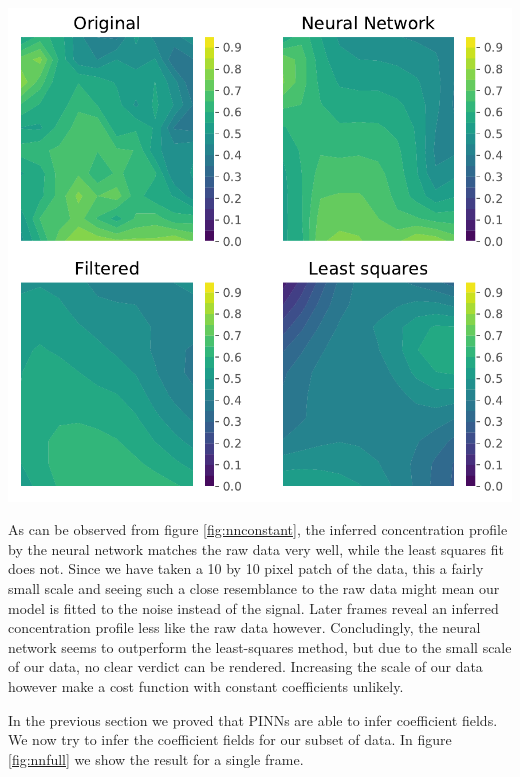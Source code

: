 \documentclass{Dissertate}
\let\origfigure\figure
\let\endorigfigure\endfigure
\renewenvironment{figure}[1][2] {
    \expandafter\origfigure\expandafter[H]
} {
    \endorigfigure
}
\begin{document}
\begin{figure}
\hypertarget{fig:nnconstant}{%
\centering
\includegraphics{source/figures/pdf/NN_Man_constant.pdf}
\caption{In the upper right panel we show the unfiltered data of our subset for frame 5. The upper right panel shows the inferred profile by the PINN, while the lower two panels show respectively the filtered data and the data reconstructed from the least squares fit.}\label{fig:nnconstant}
}
\end{figure}

As can be observed from figure \ref{fig:nnconstant}, the inferred
concentration profile by the neural network matches the raw data very
well, while the least squares fit does not. Since we have taken a 10 by
10 pixel patch of the data, this a fairly small scale and seeing such a
close resemblance to the raw data might mean our model is fitted to the noise instead of the signal. Later frames
reveal an inferred concentration profile less like the raw data however. Concludingly, the neural network seems to outperform the
least-squares method, but due to the small scale of our data, no clear verdict can be rendered. Increasing the scale of our data however make a cost function with constant coefficients unlikely. 

In the previous section we proved that PINNs are able to infer
coefficient fields. We now try to infer the coefficient fields for our
subset of data. In figure \ref{fig:nnfull} we show the result for a
single frame.
\end{document}
